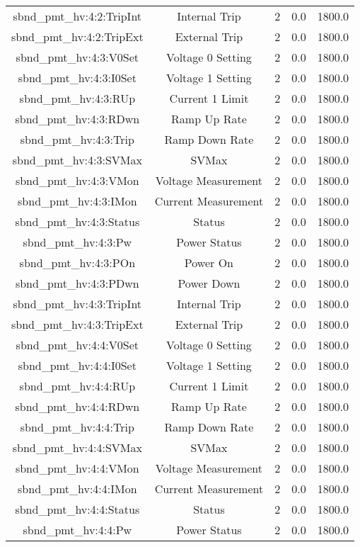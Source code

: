 \begin{center}
\begin{longtable}{c | c c c c }
sbnd\_pmt\_hv:4:2:TripInt & Internal Trip & 2 & 0.0 & 1800.0\\ 
sbnd\_pmt\_hv:4:2:TripExt & External Trip & 2 & 0.0 & 1800.0\\ 
sbnd\_pmt\_hv:4:3:V0Set & Voltage 0 Setting & 2 & 0.0 & 1800.0\\ 
sbnd\_pmt\_hv:4:3:I0Set & Voltage 1 Setting & 2 & 0.0 & 1800.0\\ 
sbnd\_pmt\_hv:4:3:RUp & Current 1 Limit & 2 & 0.0 & 1800.0\\ 
sbnd\_pmt\_hv:4:3:RDwn & Ramp Up Rate & 2 & 0.0 & 1800.0\\ 
sbnd\_pmt\_hv:4:3:Trip & Ramp Down Rate & 2 & 0.0 & 1800.0\\ 
sbnd\_pmt\_hv:4:3:SVMax & SVMax & 2 & 0.0 & 1800.0\\ 
sbnd\_pmt\_hv:4:3:VMon & Voltage Measurement & 2 & 0.0 & 1800.0\\ 
sbnd\_pmt\_hv:4:3:IMon & Current Measurement & 2 & 0.0 & 1800.0\\ 
sbnd\_pmt\_hv:4:3:Status & Status & 2 & 0.0 & 1800.0\\ 
sbnd\_pmt\_hv:4:3:Pw & Power Status & 2 & 0.0 & 1800.0\\ 
sbnd\_pmt\_hv:4:3:POn & Power On & 2 & 0.0 & 1800.0\\ 
sbnd\_pmt\_hv:4:3:PDwn & Power Down & 2 & 0.0 & 1800.0\\ 
sbnd\_pmt\_hv:4:3:TripInt & Internal Trip & 2 & 0.0 & 1800.0\\ 
sbnd\_pmt\_hv:4:3:TripExt & External Trip & 2 & 0.0 & 1800.0\\ 
sbnd\_pmt\_hv:4:4:V0Set & Voltage 0 Setting & 2 & 0.0 & 1800.0\\ 
sbnd\_pmt\_hv:4:4:I0Set & Voltage 1 Setting & 2 & 0.0 & 1800.0\\ 
sbnd\_pmt\_hv:4:4:RUp & Current 1 Limit & 2 & 0.0 & 1800.0\\ 
sbnd\_pmt\_hv:4:4:RDwn & Ramp Up Rate & 2 & 0.0 & 1800.0\\ 
sbnd\_pmt\_hv:4:4:Trip & Ramp Down Rate & 2 & 0.0 & 1800.0\\ 
sbnd\_pmt\_hv:4:4:SVMax & SVMax & 2 & 0.0 & 1800.0\\ 
sbnd\_pmt\_hv:4:4:VMon & Voltage Measurement & 2 & 0.0 & 1800.0\\ 
sbnd\_pmt\_hv:4:4:IMon & Current Measurement & 2 & 0.0 & 1800.0\\ 
sbnd\_pmt\_hv:4:4:Status & Status & 2 & 0.0 & 1800.0\\ 
sbnd\_pmt\_hv:4:4:Pw & Power Status & 2 & 0.0 & 1800.0\\ 

\end{longtable}
\end{center}
